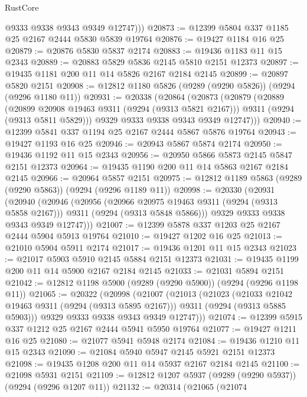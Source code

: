 \begin{lexlean}{RustCore}
\begin{coremodule}
          @9333
          @9338
          @9343
          @9349
          @12747)))
@20873 := @12399 @5804 @337 @1185 @25 @2167 @2444 @5830 @5839 @19764
@20876 := @19427 @1184 @16 @25
@20879 := @20876 @5830 @5837 @2174
@20883 := @19436 @1183 @11 @15 @2343
@20889 := @20883 @5829 @5836 @2145 @5810 @2151 @12373
@20897 := @19435 @1181 @200 @11 @14 @5826 @2167 @2184 @2145
@20899 := @20897 @5820 @2151
@20908 := @12812 @1180 @5826 (@9289 (@9290 @5826)) (@9294 (@9296 @1180 @11))
@20931 := @20338
    (@20864
      (@20873
        (@20879
          (@20889
            (@20899 @20908 @19463 @9311 (@9294 (@9313 @5821 @2167)))
            @9311
            (@9294 (@9313 @5811 @5829)))
          @9329
          @9333
          @9338
          @9343
          @9349
          @12747)))
@20940 := @12399 @5841 @337 @1194 @25 @2167 @2444 @5867 @5876 @19764
@20943 := @19427 @1193 @16 @25
@20946 := @20943 @5867 @5874 @2174
@20950 := @19436 @1192 @11 @15 @2343
@20956 := @20950 @5866 @5873 @2145 @5847 @2151 @12373
@20964 := @19435 @1190 @200 @11 @14 @5863 @2167 @2184 @2145
@20966 := @20964 @5857 @2151
@20975 := @12812 @1189 @5863 (@9289 (@9290 @5863)) (@9294 (@9296 @1189 @11))
@20998 := @20330
    (@20931
      (@20940
        (@20946
          (@20956
            (@20966 @20975 @19463 @9311 (@9294 (@9313 @5858 @2167)))
            @9311
            (@9294 (@9313 @5848 @5866)))
          @9329
          @9333
          @9338
          @9343
          @9349
          @12747)))
@21007 := @12399 @5878 @337 @1203 @25 @2167 @2444 @5904 @5913 @19764
@21010 := @19427 @1202 @16 @25
@21013 := @21010 @5904 @5911 @2174
@21017 := @19436 @1201 @11 @15 @2343
@21023 := @21017 @5903 @5910 @2145 @5884 @2151 @12373
@21031 := @19435 @1199 @200 @11 @14 @5900 @2167 @2184 @2145
@21033 := @21031 @5894 @2151
@21042 := @12812 @1198 @5900 (@9289 (@9290 @5900)) (@9294 (@9296 @1198 @11))
@21065 := @20322
    (@20998
      (@21007
        (@21013
          (@21023
            (@21033 @21042 @19463 @9311 (@9294 (@9313 @5895 @2167)))
            @9311
            (@9294 (@9313 @5885 @5903)))
          @9329
          @9333
          @9338
          @9343
          @9349
          @12747)))
@21074 := @12399 @5915 @337 @1212 @25 @2167 @2444 @5941 @5950 @19764
@21077 := @19427 @1211 @16 @25
@21080 := @21077 @5941 @5948 @2174
@21084 := @19436 @1210 @11 @15 @2343
@21090 := @21084 @5940 @5947 @2145 @5921 @2151 @12373
@21098 := @19435 @1208 @200 @11 @14 @5937 @2167 @2184 @2145
@21100 := @21098 @5931 @2151
@21109 := @12812 @1207 @5937 (@9289 (@9290 @5937)) (@9294 (@9296 @1207 @11))
@21132 := @20314
    (@21065
      (@21074

\end{coremodule}
\end{lexlean}
